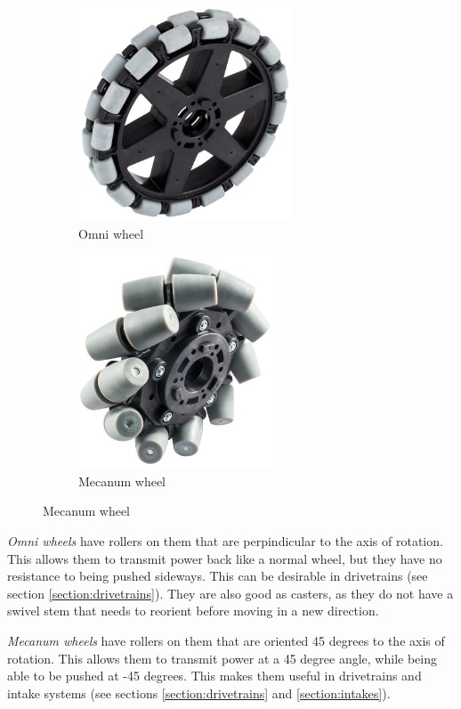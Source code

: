 	\begin{figure}[H]
		\begin{subfigure}[b]{.45\linewidth}
			\includegraphics[height=2.5in]{imgs/wheel_omni.png}
			\caption{Omni wheel}
		\end{subfigure}\begin{subfigure}[b]{.45\linewidth}
			\includegraphics[height=2.5in]{imgs/wheel_mecanum.png}
			\caption{Mecanum wheel}
		\end{subfigure}
	\end{figure}
	
	\begin{asparaenum}[a)]
		\item \textit{Omni wheels} have rollers on them that are perpindicular to the axis of rotation. This allows them to transmit power back like a normal wheel, but they have no resistance to being pushed sideways. This can be desirable in drivetrains (see section \ref{section:drivetrains}). They are also good as casters, as they do not have a swivel stem that needs to reorient before moving in a new direction.
		\item \textit{Mecanum wheels} have rollers on them that are oriented 45 degrees to the axis of rotation. This allows them to transmit power at a 45 degree angle, while being able to be pushed at -45 degrees. This makes them useful in drivetrains and intake systems (see sections \ref{section:drivetrains} and \ref{section:intakes}).
	\end{asparaenum}

